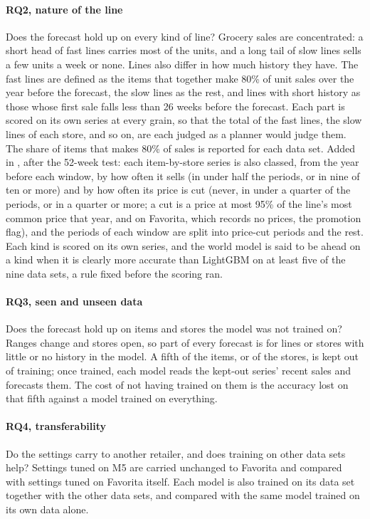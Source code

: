 \paragraph{RQ2, nature of the line} Does the forecast hold up on every kind of
line? Grocery sales are concentrated: a short head of fast lines carries most of
the units, and a long tail of slow lines sells a few units a week or none. Lines
also differ in how much history they have. The fast lines are defined as the
items that together make 80\% of unit sales over the year before the forecast,
the slow lines as the rest, and lines with short history as those whose first
sale falls less than 26 weeks before the forecast. Each part is scored on its
own series at every grain, so that the total of the fast lines, the slow lines
of each store, and so on, are each judged as a planner would judge them. The
share of items that makes 80\% of sales is reported for each data set.
Added in \thisrev{}, after the 52-week test: each item-by-store series is also
classed, from the year before each window, by how often it sells (in under half
the periods, or in nine of ten or more) and by how often its price is cut (never,
in under a quarter of the periods, or in a quarter or more; a cut is a price at
most 95\% of the line's most common price that year, and on Favorita, which
records no prices, the promotion flag), and the periods of each window are split
into price-cut periods and the rest. Each kind is scored on its own series, and
the world model is said to be ahead on a kind when it is clearly more accurate
than LightGBM on at least five of the nine data sets, a rule fixed before the
scoring ran.

\paragraph{RQ3, seen and unseen data} Does the forecast hold up on items and stores
the model was not trained on? Ranges change and stores open, so part of every
forecast is for lines or stores with little or no history in the model. A fifth
of the items, or of the stores, is kept out of training; once trained, each
model reads the kept-out series' recent sales and forecasts them. The cost of
not having trained on them is the accuracy lost on that fifth against a model
trained on everything.

\paragraph{RQ4, transferability} Do the settings carry to another retailer, and does
training on other data sets help? Settings tuned on M5 are carried
unchanged to Favorita and compared with settings tuned on Favorita itself. Each
model is also trained on its data set together with the other data sets, and
compared with the same model trained on its own data alone.

